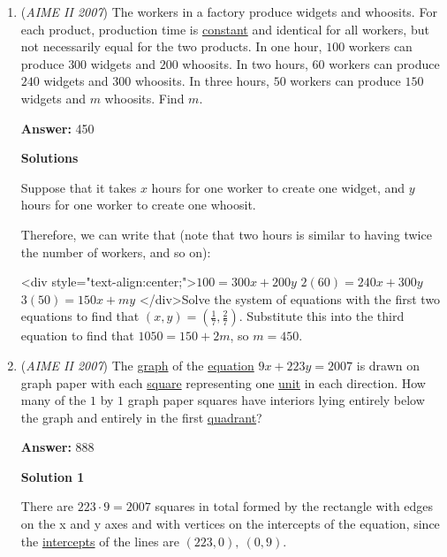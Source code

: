 \begin{enumerate}
 


	\item (\textit{AIME II 2007}) The workers in a factory produce widgets and whoosits. For each product, production time is \href{https://artofproblemsolving.com/wiki/index.php?title=Constant}{constant} and identical for all workers, but not necessarily equal for the two products. In one hour, $100$ workers can produce $300$ widgets and $200$ whoosits. In two hours, $60$ workers can produce $240$ widgets and $300$ whoosits. In three hours, $50$ workers can produce $150$ widgets and $m$ whoosits. Find $m$.


 
 \textbf{Answer: }450



\textbf{Solutions}

Suppose that it takes $x$ hours for one worker to create one widget, and $y$ hours for one worker to create one whoosit.

 Therefore, we can write that (note that two hours is similar to having twice the number of workers, and so on):

 <div style="text-align:center;">$100 = 300x + 200y$
$2(60) = 240x + 300y$
$3(50) = 150x + my$
</div>Solve the system of equations with the first two equations to find that $(x,y) = \left(\frac{1}{7}, \frac{2}{7}\right)$. Substitute this into the third equation to find that $1050 = 150 + 2m$, so $m = \boxed{450}$.

 


	\item (\textit{AIME II 2007}) The \href{https://artofproblemsolving.com/wiki/index.php?title=Graph}{graph} of the \href{https://artofproblemsolving.com/wiki/index.php?title=Equation}{equation} $9x+223y=2007$ is drawn on graph paper with each \href{https://artofproblemsolving.com/wiki/index.php?title=Square}{square} representing one \href{https://artofproblemsolving.com/wiki/index.php?title=Unit\_square}{unit} in each direction. How many of the $1$ by $1$ graph paper squares have interiors lying entirely below the graph and entirely in the first \href{https://artofproblemsolving.com/wiki/index.php?title=Quadrant}{quadrant}?


 
 \textbf{Answer: }888



\textbf{Solution 1}

There are $223 \cdot 9 = 2007$ squares in total formed by the rectangle with edges on the x and y axes and with vertices on the intercepts of the equation, since the \href{https://artofproblemsolving.com/wiki/index.php?title=Intercept&action=edit&redlink=1}{intercepts} of the lines are $(223,0),\ (0,9)$.


\end{enumerate}

